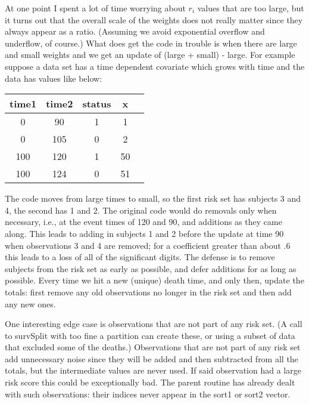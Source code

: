\documentclass{article}
\begin{document}
At one point I spent a lot of time worrying about $r_i$ values that are too
large, but it turns out that the overall scale of the weights does not
really matter since they always appear as a ratio.  
(Assuming we avoid exponential overflow and underflow, of course.)
What does get the code in trouble is when there are large and small
weights and we get an update of (large + small) - large.
For example suppose a data set has a time dependent covariate which grows
with time and the data has values like below:

\begin{center}
  \begin{tabular}{ccccc}
    time1 & time2 & status & x \\ \hline
    0   &    90  &  1     & 1 \\
    0   &    105  &  0     & 2  \\
    100 &    120  &  1     & 50  \\
    100 &    124  &  0     & 51 
    \end{tabular} 
\end{center}
The code moves from large times to small, so the first risk set has
subjects 3 and 4, the second has 1 and 2.  
The original code would do removals only when necessary, i.e., at the
event times of 120 and 90, and additions as they came along.  
This leads to adding in subjects 1 and 2 before the update at time 90
when observations 3 and 4 are removed;
for a coefficient greater than about .6 this leads to a loss of all of
the significant digits.  
The defense is to remove subjects from the risk set as early
as possible, and defer additions for as long as possible. 
Every time we hit a new (unique) death time, and only then,
update the totals:  first remove any
old observations no longer in the risk set and then add any new ones.

One interesting edge case is observations that are not part of any risk
set.  (A call to survSplit with too fine a partition can create these, or
using a subset of data that excluded some of the deaths.)  
Observations that are not part of any risk set add unnecessary noise since
they will be added and then subtracted from all the totals, but the
intermediate values are never used.  If said observation had a large risk
score this could be exceptionally bad.
The parent routine has already dealt with such observations: their indices 
never appear in the sort1 or sort2 vector.
\end{document}
